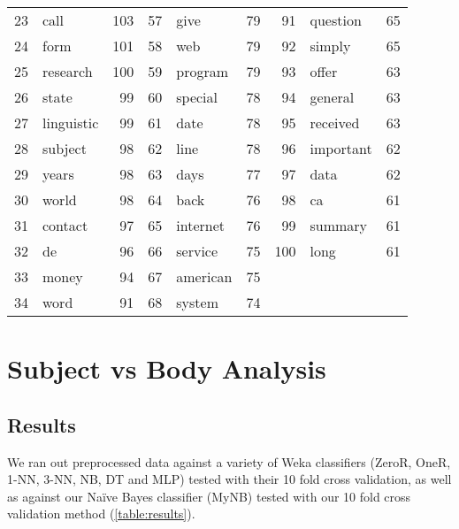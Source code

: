 \documentclass[10pt, a4paper]{article}
\begin{document}
\begin{table}[H]
\begin{tabular}{@{}rlrrlrrlr@{}}
23 & call & 103 & 57 & give & 79 & 91 & question & 65 \\
24 & form & 101 & 58 & web & 79 & 92 & simply & 65 \\
25 & research & 100 & 59 & program & 79 & 93 & offer & 63 \\
26 & state & 99 & 60 & special & 78 & 94 & general & 63 \\
27 & linguistic & 99 & 61 & date & 78 & 95 & received & 63 \\
28 & subject & 98 & 62 & line & 78 & 96 & important & 62 \\
29 & years & 98 & 63 & days & 77 & 97 & data & 62 \\
30 & world & 98 & 64 & back & 76 & 98 & ca & 61 \\
31 & contact & 97 & 65 & internet & 76 & 99 & summary & 61 \\
32 & de & 96 & 66 & service & 75 & 100 & long & 61 \\
33 & money & 94 & 67 & american & 75 & & & \\
34 & word & 91 & 68 & system & 74 & & & \\
\bottomrule
\end{tabular}
\label{table:bodycorpus}
\end{table}

\section{Subject vs Body Analysis}

\subsection{Results}

We ran out preprocessed data against a variety of Weka classifiers (ZeroR, OneR, 1-NN, 3-NN, NB, DT and MLP) tested with their 10 fold cross validation, as well as against our Na\"ive Bayes classifier (MyNB) tested with our 10 fold cross validation method (\autoref{table:results}).

\end{document}
